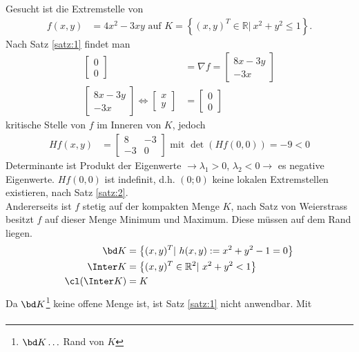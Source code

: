 \begin{exmp}
Gesucht ist die Extremstelle von 
\begin{align*}
	f(x,y) & = 4x^2-3xy \text{ auf } K=\left\{(x,y)^T\in\mathbb{R}|\ x^2+y^2\le 1 \right\}.
\end{align*}
Nach Satz \ref{satz:1} findet man 
\begin{align*}
	\begin{bmatrix}
	0\\0
	\end{bmatrix} & = \nabla f = \begin{bmatrix}
	8x-3y\\-3x
	\end{bmatrix}\\
	\begin{bmatrix}
	8x-3y\\-3x
	\end{bmatrix}\Leftrightarrow \begin{bmatrix}
	x\\y
	\end{bmatrix} & = \begin{bmatrix}
	0\\0
	\end{bmatrix}
\end{align*}
kritische Stelle von $f$ im Inneren von $K$, jedoch
\begin{align*}
		H f(x,y) & = \begin{bmatrix}
		8 & -3\\ -3 & 0
		\end{bmatrix} \text{ mit } \det\left(H f(0,0)\right) = -9 < 0
\end{align*}
Determinante ist Produkt der Eigenwerte $\rightarrow \lambda_1>0$, $\lambda_2<0\rightarrow$ es negative Eigenwerte. $H f(0,0)$ ist indefinit, d.h. $(0;0)$ keine lokalen Extremstellen
existieren, nach Satz \ref{satz:2}.\\ 
Andererseits ist $f$ stetig auf der kompakten Menge $K$, nach Satz von Weierstrass besitzt $f$ auf dieser Menge Minimum und Maximum. Diese müssen
auf dem Rand liegen.
\begin{align*}
	\bd K  & = \left\{(x,y)^T|\ h(x,y):=x^2+y^2-1=0\right\}\\
	\Inter K &=\left\{(x,y)^T\in\mathbb{R}^2|\ x^2+y^2<1 \right\}\\
	\cl(\Inter K) & = K
\end{align*}
Da $\bd K$\footnote{$\bd K\ldots$ Rand von $K$} keine offene Menge ist, ist Satz \ref{satz:1} nicht anwendbar. Mit
\begin{align*}

\end{align*}
\end{exmp}
